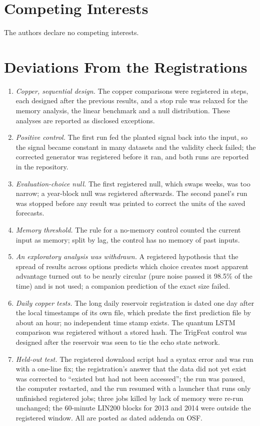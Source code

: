 \documentclass{ieeeaccess}
\begin{document}
\section*{Competing Interests}
The authors declare no competing interests.

\appendices

\section{Deviations From the Registrations}
\label{app:deviations}
\begin{enumerate}
\item \textit{Copper, sequential design.} The copper comparisons were registered in steps, each designed after the previous results, and a stop rule was relaxed for the memory analysis, the linear benchmark and a null distribution. These analyses are reported as disclosed exceptions.
\item \textit{Positive control.} The first run fed the planted signal back into the input, so the signal became constant in many datasets and the validity check failed; the corrected generator was registered before it ran, and both runs are reported in the repository.
\item \textit{Evaluation-choice null.} The first registered null, which swaps weeks, was too narrow; a year-block null was registered afterwards. The second panel's run was stopped before any result was printed to correct the units of the saved forecasts.
\item \textit{Memory threshold.} The rule for a no-memory control counted the current input as memory; split by lag, the control has no memory of past inputs.
\item \textit{An exploratory analysis was withdrawn.} A registered hypothesis that the spread of results across options predicts which choice creates most apparent advantage turned out to be nearly circular (pure noise passed it 98.5\% of the time) and is not used; a companion prediction of the exact size failed.
\item \textit{Daily copper tests.} The long daily reservoir registration is dated one day after the local timestamps of its own file, which predate the first prediction file by about an hour; no independent time stamp exists. The quantum LSTM comparison was registered without a stored hash. The TrigFeat control was designed after the reservoir was seen to tie the echo state network.
\item \textit{Held-out test.} The registered download script had a syntax error and was run with a one-line fix; the registration's answer that the data did not yet exist was corrected to ``existed but had not been accessed''; the run was paused, the computer restarted, and the run resumed with a launcher that runs only unfinished registered jobs; three jobs killed by lack of memory were re-run unchanged; the 60-minute LIN200 blocks for 2013 and 2014 were outside the registered window. All are posted as dated addenda on OSF.
\end{enumerate}
\end{document}
